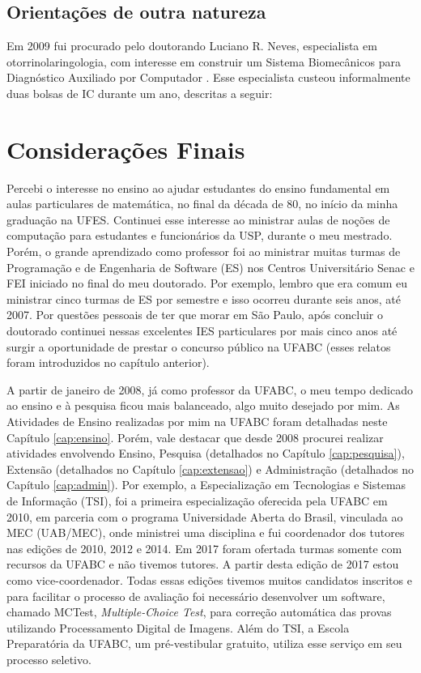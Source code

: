 

\subsection{Orientações de outra natureza}

Em 2009 fui procurado pelo doutorando Luciano R. Neves, especialista em otorrinolaringologia, com interesse em construir um Sistema Biomecânicos para Diagnóstico Auxiliado por Computador \cite{2009:Cuzziol.Marques.ea,2010:Neves.Marques.ea}. Esse especialista custeou informalmente duas bolsas de IC durante um ano, descritas a seguir:



\section{Considerações Finais}

Percebi o interesse no ensino ao ajudar estudantes do ensino fundamental em aulas particulares de matemática, no final da década de 80, no início da minha graduação na UFES. Continuei esse interesse ao ministrar aulas de noções de computação para estudantes e funcionários da USP, durante o meu mestrado. Porém, o grande aprendizado como professor foi ao ministrar muitas turmas de Programação e de Engenharia de Software (ES) nos Centros Universitário Senac e FEI iniciado no final do meu doutorado. Por exemplo, lembro que era comum eu ministrar cinco turmas de ES por semestre e isso ocorreu durante seis anos, até 2007. Por questões pessoais de ter que morar em São Paulo, após concluir o doutorado continuei nessas excelentes IES particulares por mais cinco anos até surgir a oportunidade de prestar o concurso público na UFABC (esses relatos foram introduzidos no capítulo anterior). 

A partir de janeiro de 2008, já como professor da UFABC, o meu tempo dedicado ao ensino e à pesquisa ficou mais balanceado, algo muito desejado por mim. As Atividades de Ensino realizadas por mim na UFABC foram detalhadas neste Capítulo \ref{cap:ensino}. Porém, vale destacar que desde 2008 procurei realizar atividades envolvendo Ensino, Pesquisa (detalhados no Capítulo \ref{cap:pesquisa}), Extensão (detalhados no Capítulo \ref{cap:extensao}) e Administração (detalhados no Capítulo \ref{cap:admin}). Por exemplo, a Especialização em Tecnologias e Sistemas de Informação (TSI), foi a primeira especialização oferecida pela UFABC em 2010, em parceria com o programa Universidade Aberta do Brasil, vinculada ao MEC (UAB/MEC), onde ministrei uma disciplina e fui coordenador dos tutores nas edições de 2010, 2012 e 2014. Em 2017 foram ofertada turmas somente com recursos da UFABC e não tivemos tutores. A partir desta edição de 2017 estou como vice-coordenador. Todas essas edições tivemos muitos candidatos inscritos e para facilitar o processo de avaliação foi necessário desenvolver um software, chamado MCTest, \textit{Multiple-Choice Test}, para correção automática das provas utilizando Processamento Digital de Imagens. Além do TSI, a Escola Preparatória da UFABC, um pré-vestibular gratuito, utiliza esse serviço em seu processo seletivo. 

